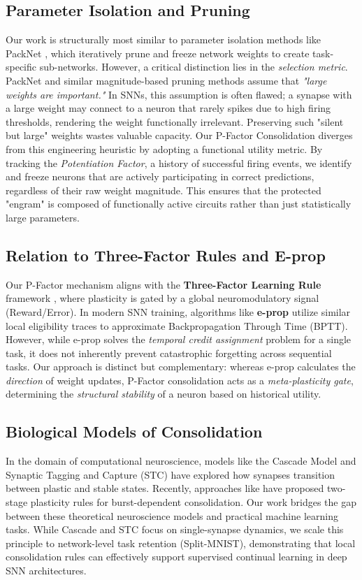 \documentclass[5p,times]{elsarticle}
\begin{document}
\subsection{Parameter Isolation and Pruning} Our work is structurally most similar to parameter isolation methods like PackNet \cite{Mallya2018}, which iteratively prune and freeze network weights to create task-specific sub-networks. However, a critical distinction lies in the \textit{selection metric}. PackNet and similar magnitude-based pruning methods assume that \textit{"large weights are important."} In SNNs, this assumption is often flawed; a synapse with a large weight may connect to a neuron that rarely spikes due to high firing thresholds, rendering the weight functionally irrelevant. Preserving such "silent but large" weights wastes valuable capacity. Our P-Factor Consolidation diverges from this engineering heuristic by adopting a functional utility metric. By tracking the \textit{Potentiation Factor}, a history of successful firing events, we identify and freeze neurons that are actively participating in correct predictions, regardless of their raw weight magnitude. This ensures that the protected "engram" is composed of functionally active circuits rather than just statistically large parameters.

\subsection{Relation to Three-Factor Rules and E-prop}
Our P-Factor mechanism aligns with the \textbf{Three-Factor Learning Rule} framework \cite{Fremaux2016}, where plasticity is gated by a global neuromodulatory signal (Reward/Error). In modern SNN training, algorithms like \textbf{e-prop} \cite{Bellec2020} utilize similar local eligibility traces to approximate Backpropagation Through Time (BPTT). However, while e-prop solves the \textit{temporal credit assignment} problem for a single task, it does not inherently prevent catastrophic forgetting across sequential tasks. Our approach is distinct but complementary: whereas e-prop calculates the \textit{direction} of weight updates, P-Factor consolidation acts as a \textit{meta-plasticity gate}, determining the \textit{structural stability} of a neuron based on historical utility.

\subsection{Biological Models of Consolidation} In the domain of computational neuroscience, models like the Cascade Model \cite{Fusi2005} and Synaptic Tagging and Capture (STC) \cite{Clopath2008} have explored how synapses transition between plastic and stable states. Recently, approaches like \cite{Luboeinski2021} have proposed two-stage plasticity rules for burst-dependent consolidation. Our work bridges the gap between these theoretical neuroscience models and practical machine learning tasks. While Cascade and STC focus on single-synapse dynamics, we scale this principle to network-level task retention (Split-MNIST), demonstrating that local consolidation rules can effectively support supervised continual learning in deep SNN architectures.
\end{document}
